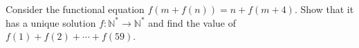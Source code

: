 Consider the functional equation $f(m + f(n)) = n + f(m + 4)$. Show that it has a unique solution $f : \mathbb{N}^* \to \mathbb{N}^*$ and find the value of $f(1) + f(2) + \cdots + f(59)$.
